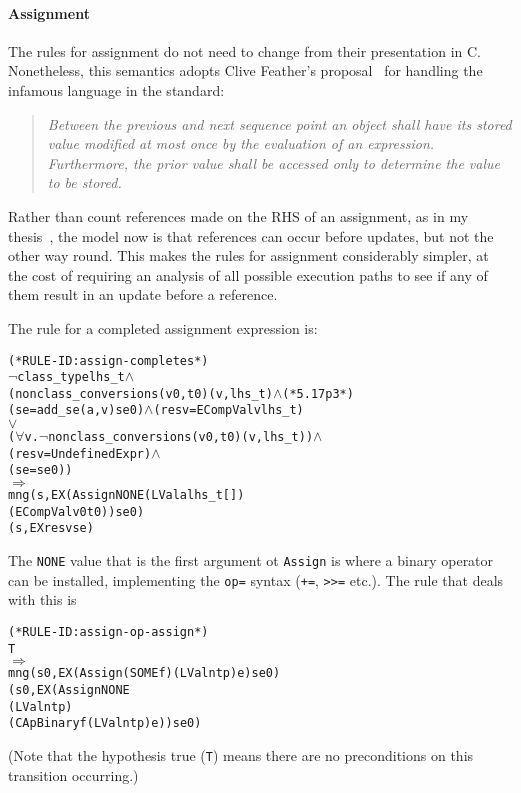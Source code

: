 \documentclass[11pt]{article}
\begin{document}
\paragraph{Assignment}
The rules for assignment do not need to change from their presentation
in C.  Nonetheless, this semantics adopts Clive
Feather's proposal~\cite{Feather2000} for
handling the infamous language in the standard:
\begin{quotation}
\itshape
    Between the previous and next sequence point an  object
    shall  have  its  stored  value modified at most once by the
    evaluation of an expression.  Furthermore, the  prior  value
    shall  be  accessed  only  to  determine  the  value  to  be
    stored.
\end{quotation}
Rather than count references made on the RHS of an assignment, as in
my thesis~\cite{Norrish98}, the model now is that references can occur
before updates, but not the other way round.  This makes the rules for
assignment considerably simpler, at the cost of requiring an analysis
of all possible execution paths to see if any of them result in an
update before a reference.

%
The rule for a completed assignment expression is:
\begin{center}
\label{rule:assign-completes}
%
\begin{minipage}{\textwidth}
\begin{alltt}
(* RULE-ID: assign-completes *)
    \(\neg\)class_type lhs_t \(\land\)
    (nonclass_conversion s (v0,t0) (v,lhs_t) \(\land\) (* 5.17 p3 *)
     (se = add_se (a, v) se0) \(\land\) (resv = ECompVal v lhs_t)
                          \(\lor\)
     (\(\forall\)v. \(\neg\)nonclass_conversion s (v0, t0) (v, lhs_t)) \(\land\)
     (resv = UndefinedExpr) \(\land\)
     (se = se0))
   \(\Rightarrow\)
     mng (s, EX (Assign NONE (LVal a lhs_t [])
                             (ECompVal v0 t0)) se0)
         (s, EX resv se)
\end{alltt}
\end{minipage}
\end{center}
The \texttt{NONE} value that is the first argument ot \texttt{Assign}
is where a binary operator can be installed, implementing the
\texttt{op=} syntax (\texttt{+=}, \texttt{>>=} etc.).  The rule that
deals with this is
%
\begin{alltt}
(* RULE-ID: assign-op-assign *)
     T
   \(\Rightarrow\)
     mng (s0, EX (Assign (SOME f) (LVal n t p) e) se0)
         (s0, EX (Assign NONE
                         (LVal n t p)
                         (CApBinary f (LVal n t p) e)) se0)

\end{alltt}
(Note that the hypothesis true (\texttt{T}) means there are no
preconditions on this transition occurring.)
\end{document}
